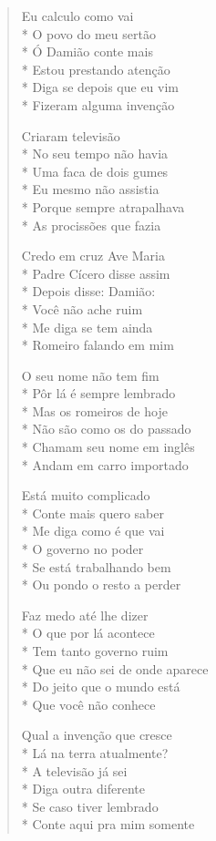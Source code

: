 \begin{verse}
Eu calculo como vai\\*
O povo do meu sertão\\*
Ó Damião conte mais\\*
Estou prestando atenção\\*
Diga se depois que eu vim\\*
Fizeram alguma invenção

Criaram televisão\\*
No seu tempo não havia\\*
Uma faca de dois gumes\\*
Eu mesmo não assistia\\*
Porque sempre atrapalhava\\*
As procissões que fazia

Credo em cruz Ave Maria\\*
Padre Cícero disse assim\\*
Depois disse: Damião:\\*
Você não ache ruim\\*
Me diga se tem ainda\\*
Romeiro falando em mim

O seu nome não tem fim\\*
Pôr lá é sempre lembrado\\*
Mas os romeiros de hoje\\*
Não são como os do passado\\*
Chamam seu nome em inglês\\*
Andam em carro importado

Está muito complicado\\*
Conte mais quero saber\\*
Me diga como é que vai\\*
O governo no poder\\*
Se está trabalhando bem\\*
Ou pondo o resto a perder

Faz medo até lhe dizer\\*
O que por lá acontece\\*
Tem tanto governo ruim\\*
Que eu não sei de onde aparece\\*
Do jeito que o mundo está\\*
Que você não conhece

Qual a invenção que cresce\\*
Lá na terra atualmente?\\*
A televisão já sei\\*
Diga outra diferente\\*
Se caso tiver lembrado\\*
Conte aqui pra mim somente


\end{verse}
